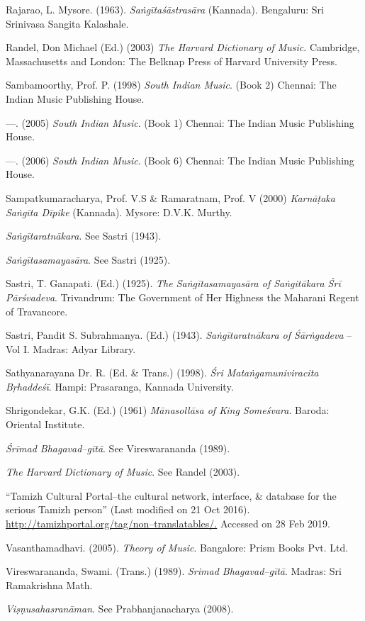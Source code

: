 \begin{thebibliography}{99}
  Rajarao, L. Mysore. (1963). \textit{Saṅgītaśāstrasāra} (Kannada). Bengaluru: Sri Srinivasa Sangita Kalashale.

  Randel, Don Michael (Ed.) (2003) \textit{The Harvard Dictionary of Music}. Cambridge, Massachusetts and London: The Belknap Press of Harvard University Press.

  Sambamoorthy, Prof. P. (1998) \textit{South Indian Music}. (Book 2) Chennai: The Indian Music Publishing House.

  —. (2005) \textit{South Indian Music}. (Book 1) Chennai: The Indian Music Publishing House.

  —. (2006) \textit{South Indian Music}. (Book 6) Chennai: The Indian Music Publishing House.

  Sampatkumaracharya, Prof. V.S \& Ramaratnam, Prof. V (2000) \textit{Karnāṭaka Saṅgīta Dīpike} (Kannada). Mysore: D.V.K. Murthy.

  \textit{Saṅgītaratnākara}. See Sastri (1943).

  \textit{Saṅgītasamayasāra}. See Sastri (1925).

  Sastri, T. Ganapati. (Ed.) (1925). \textit{The Saṅgītasamayasāra of Saṅgitākara Śrī Pārśvadeva}. Trivandrum: The Government of Her Highness the Maharani Regent of Travancore. 

  Sastri, Pandit S. Subrahmanya. (Ed.) (1943). \textit{Saṅgītaratnākara of Śārṅgadeva} – Vol I. Madras: Adyar Library.

  Sathyanarayana Dr. R. (Ed. \& Trans.) (1998). \textit{Śri Mataṅgamuniviracita Bṛhaddeśī}. Hampi: Prasaranga, Kannada University.

  Shrigondekar, G.K. (Ed.) (1961) \textit{Mānasollāsa of King Someśvara}. Baroda: Oriental Institute.

  \textit{Śrīmad Bhagavad–gītā}. See Vireswarananda (1989).

  \textit{The Harvard Dictionary of Music}. See Randel (2003).

  “Tamizh Cultural Portal–the cultural network, interface, \& database for the serious Tamizh person” (Last modified on 21 Oct 2016). \url{http://tamizhportal.org/tag/non–translatables/.} Accessed on 28 Feb 2019.

  Vasanthamadhavi. (2005). \textit{Theory of Music}. Bangalore: Prism Books Pvt. Ltd.

  Vireswarananda, Swami. (Trans.) (1989). \textit{Srimad Bhagavad–gītā}. Madras: Sri Ramakrishna Math.

  \textit{Viṣṇusahasranāman}. See Prabhanjanacharya (2008).

 \end{thebibliography}

